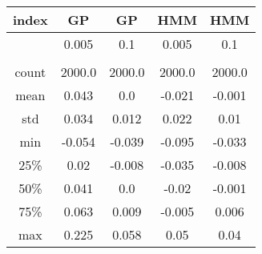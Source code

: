 \centering \begin{tabular}{c|c|c|c|c}
index	&GP	&GP	&HMM	&HMM\\\hline
	&0.005	&0.1	&0.005	&0.1\\
	&	&	&	&\\
count	&2000.0	&2000.0	&2000.0	&2000.0\\
mean	&0.043	&0.0	&-0.021	&-0.001\\
std	&0.034	&0.012	&0.022	&0.01\\
min	&-0.054	&-0.039	&-0.095	&-0.033\\
25\%	&0.02	&-0.008	&-0.035	&-0.008\\
50\%	&0.041	&0.0	&-0.02	&-0.001\\
75\%	&0.063	&0.009	&-0.005	&0.006\\
max	&0.225	&0.058	&0.05	&0.04\\
\end{tabular}
